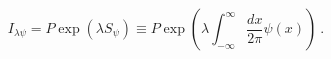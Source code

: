 \begin{equation}
I_{\lambda \psi}=P\exp \left(
\lambda S_{\psi}\right)\equiv
P\exp \left(\lambda \int_{-\infty}^{\infty}
\frac{dx}{2\pi}\psi(x)\right)
\ .
\end{equation}


